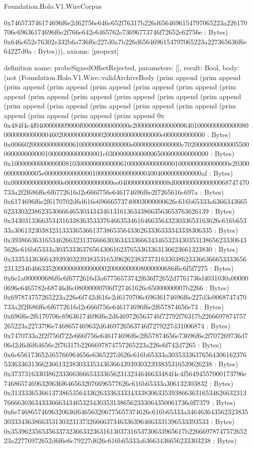 \begin{lexlean}{Foundation.Holo.V1.WireCorpus}
\begin{semanticmodule}
{0x746573746174696f6e2d62756e646c652f76317b226d6564696154797065223a226170706c69636174696f6e2f766e642e6465762e73696773746f72652e62756e : Bytes) 0x646c652e76302e332b6a736f6e227d0a7b226d6564696154797065223a227365636f6e64227d0a : Bytes))),
  axioms: [propext]
}

definition{
  name: probeSignedOffsetRejected,
  parameters: [],
  result: Bool,
  body: (not (Foundation.Holo.V1.Wire::validArchiveBody (prim append (prim append (prim append (prim append (prim append (prim append (prim append (prim append (prim append (prim append (prim append (prim append (prim append (prim append (prim append (prim append (prim append (prim append (prim append (prim append (prim append (prim append 0x 0x484f4c4f0400000009000f00000000000000e20000000000000064010000000000000800000000000000460200000000000020000000000000000e000000000000 : Bytes) 0x00660200000000000061000000000000000e00000000000000c702000000000000550000000000000010000000000000001c030000000000006500000000000000 : Bytes) 0x1000000000000000810300000000000061000000000000001000000000000000e2030000000000005e0000000000000010000000000000004004000000000000af : Bytes) 0x000000000000000e00000000000000ee040000000000008d0000000000000068747470733a2f2f686f6c6f6772616d2e666f756e646174696f6e2f7265616c697a : Bytes) 0x6174696f6e2f6170702d6d616e69666573740003000000626c616b65333a6366343665623330323862353066646530343434613161363438663563653763626139 : Bytes) 0x3430313366353431633836353337646635346164663564323033653163626c616b65333a3061323038323133336536613738653564336263336333343338306335 : Bytes) 0x3938663631653462663231376666303634333666343465323430353138656233306435626c616b65333a3035333637656430616237653363363136623661323830 : Bytes) 0x33353436366439393032393835316539626238373731633038623336636665333365623132346466335200000000000000020000000008000000686f6c6f5f7275 : Bytes) 0x6e1a000000686f6c6f6772616d3a67756573742f636f72652d7761736d4031030a000000696e6465782e68746d6c08000000706f727461626c65000000007b2266 : Bytes) 0x697874757265223a226e6f742d616e2d6170706c69636174696f6e227d3e0068747470733a2f2f686f6c6f6772616d2e666f756e646174696f6e2f657874656e73 : Bytes) 0x696f6e2f6170706c69636174696f6e2d6469726563746f72792f76317b2266697874757265223a2273796e7468657469632d6469726563746f7279227d31006874 : Bytes) 0x7470733a2f2f756f722e666f756e646174696f6e2f657874656e73696f6e2f707269736d706d2d6d6f64656c2f76317b2266697874757265223a226e6f742d7265 : Bytes) 0x6c656173652d65766964656e6365227d626c616b65333a303533363765643061623765336336313662366132383033353436366439393032393835316539626238 : Bytes) 0x37373163303862333663666533336562313234646633484f4c4f56494557000173796e74686574696320636f6465632076696577626c616b65333a306132303832 : Bytes) 0x313333653661373865356433626333633334333830633539386636316534626632313766663036343336663434653234303531386562333064350061736dff7379 : Bytes) 0x6e74686574696320636f646563206775657374626c616b65333a346463643562323835303334363866353130323137326666373463363964663331396533393533 : Bytes) 0x353962356535633732366332363161303731653730633965617b2266697874757265223a22776972652d6f6e6c79227d626c616b65333a63663436656233303238 : Bytes) }
\end{semanticmodule}
\end{lexlean}
